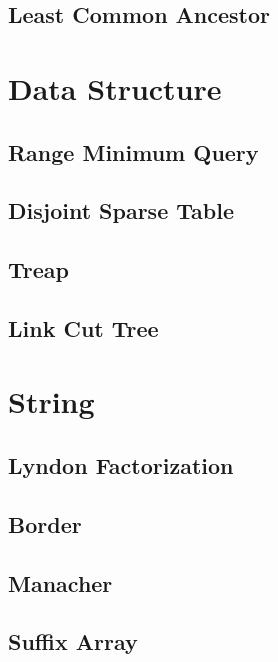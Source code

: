 \documentclass{article}
\begin{document}
\begin{multicols}{2}
    \subsection{Least Common Ancestor}
    

    \section{Data Structure}
    \subsection{Range Minimum Query}
    
    \subsection{Disjoint Sparse Table}
    
    \subsection{Treap}
    
    \subsection{Link Cut Tree}
    

    \section{String}
    \subsection{Lyndon Factorization}
    
    \subsection{Border}
    
    \subsection{Manacher}
    
    \subsection{Suffix Array}
    


\end{multicols}
\end{document}
